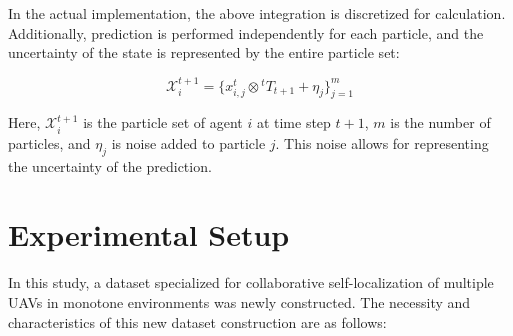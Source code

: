 \documentclass[a4paper,fleqn,10pt,twocolumn]{SICE_ISCS}
\begin{document}
In the actual implementation, the above integration is discretized for calculation. Additionally, prediction is performed independently for each particle, and the uncertainty of the state is represented by the entire particle set:

$$\mathcal{X}_i^{t+1} = \{x_{i,j}^t \otimes {}^t T_{t+1} + \eta_j\}_{j=1}^m$$

Here, $\mathcal{X}_i^{t+1}$ is the particle set of agent $i$ at time step $t+1$, $m$ is the number of particles, and $\eta_j$ is noise added to particle $j$. This noise allows for representing the uncertainty of the prediction.

\section{Experimental Setup}
In this study, a dataset specialized for collaborative self-localization of multiple UAVs in monotone environments was newly constructed. The necessity and characteristics of this new dataset construction are as follows:
\end{document}

